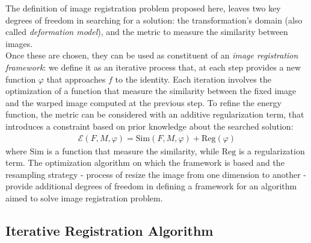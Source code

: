 The definition of image registration problem proposed here, leaves two key degrees of freedom in searching for a solution: the transformation's domain (also called \emph{deformation model}), and the metric to measure the similarity between images. \\
Once these are chosen, they can be used as constituent of an \emph{image registration framework}: we define it as an iterative process that, at each step provides a new function $\varphi$ that approaches $f$ to the identity.
Each iteration involves the optimization of a function that measure the similarity between the fixed image and the warped image computed at the previous step. To refine the energy function, the metric can be considered with an additive regularization term, that introduces a constraint based on prior knowledge about the searched solution:
\begin{align}\label{eq:general_cost_function}
\mathcal{E}(F, M, \varphi) = \text{Sim}(F,M,\varphi) + \text{Reg}(\varphi) 
\end{align}
where $\text{Sim}$ is a function that measure the similarity, while $\text{Reg}$ is a regularization term.
The optimization algorithm on which the framework is based and the resampling strategy - process of resize the image from one dimension to another - provide additional degrees of freedom in defining a framework for an algorithm aimed to solve image registration problem.

\subsection{Iterative Registration Algorithm}

